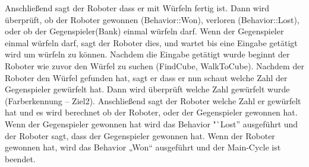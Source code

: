     Anschließend sagt der Roboter dass er mit Würfeln fertig ist.
    Dann wird überprüft, ob der Roboter gewonnen (Behavior::Won), verloren
    (Behavior::Lost), oder ob der Gegenspieler(Bank) einmal würfeln darf.
    Wenn der Gegenspieler einmal würfeln darf, sagt der Roboter dies, und
    wartet bis eine Eingabe getätigt wird um würfeln zu können.
    Nachdem die Eingabe getätigt wurde beginnt der Roboter wie zuvor den
    Würfel zu suchen (FindCube, WalkToCube).
    Nachdem der Roboter den Würfel gefunden hat, sagt er dass er nun schaut
    welche Zahl der Gegenspieler gewürfelt hat.
    Dann wird überprüft welche Zahl gewürfelt wurde (Farberkennung – Ziel2).
    Anschließend sagt der Roboter welche Zahl er gewürfelt hat und es wird
    berechnet ob der Roboter, oder der Gegenspieler gewonnen hat.
    Wenn der Gegenspieler gewonnen hat wird das Behavior "`Lost'' ausgeführt
    und der Roboter sagt, dass der Gegenspieler gewonnen hat.
    Wenn der Roboter gewonnen hat, wird das Behavior „Won“ ausgeführt und
    der Main-Cycle ist beendet.
